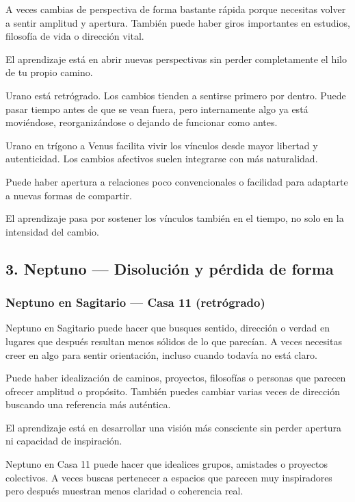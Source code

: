 \documentclass[11pt,a4paper]{article}
\begin{document}
A veces cambias de perspectiva de forma bastante rápida porque necesitas volver a sentir amplitud y apertura. También puede haber giros importantes en estudios, filosofía de vida o dirección vital.

El aprendizaje está en abrir nuevas perspectivas sin perder completamente el hilo de tu propio camino.

Urano está retrógrado. Los cambios tienden a sentirse primero por dentro. Puede pasar tiempo antes de que se vean fuera, pero internamente algo ya está moviéndose, reorganizándose o dejando de funcionar como antes.

Urano en trígono a Venus facilita vivir los vínculos desde mayor libertad y autenticidad. Los cambios afectivos suelen integrarse con más naturalidad.

Puede haber apertura a relaciones poco convencionales o facilidad para adaptarte a nuevas formas de compartir.

El aprendizaje pasa por sostener los vínculos también en el tiempo, no solo en la intensidad del cambio.

\vspace{0.8cm}

\subsection{3. Neptuno — Disolución y pérdida de forma}

\subsubsection*{Neptuno en Sagitario — Casa 11 (retrógrado)}

Neptuno en Sagitario puede hacer que busques sentido, dirección o verdad en lugares que después resultan menos sólidos de lo que parecían. A veces necesitas creer en algo para sentir orientación, incluso cuando todavía no está claro.

Puede haber idealización de caminos, proyectos, filosofías o personas que parecen ofrecer amplitud o propósito. También puedes cambiar varias veces de dirección buscando una referencia más auténtica.

El aprendizaje está en desarrollar una visión más consciente sin perder apertura ni capacidad de inspiración.

Neptuno en Casa 11 puede hacer que idealices grupos, amistades o proyectos colectivos. A veces buscas pertenecer a espacios que parecen muy inspiradores pero después muestran menos claridad o coherencia real.
\end{document}
